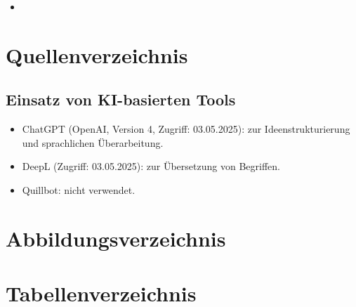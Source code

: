 \documentclass[11pt,a4paper]{article}
\makeatletter
\renewcommand{\listoffigures}{%
  \begingroup
    \@starttoc{lof}%
  \endgroup
}
\renewcommand{\listoftables}{%
  \begingroup
    \@starttoc{lot}%
  \endgroup
}
\makeatother
\begin{document}
\begin{itemize}
  \item 
\end{itemize}

\cleardoublepage
\section{Quellenverzeichnis}

\printbibliography[heading=none]

\vspace{1cm}

\subsection{Einsatz von KI-basierten Tools}
\begin{itemize}
  \item ChatGPT (OpenAI, Version 4, Zugriff: 03.05.2025): zur Ideenstrukturierung und sprachlichen Überarbeitung.
  \item DeepL (Zugriff: 03.05.2025): zur Übersetzung von Begriffen.
  \item Quillbot: nicht verwendet.
\end{itemize}

\cleardoublepage
\section{Abbildungsverzeichnis}
\listoffigures

\cleardoublepage
\section{Tabellenverzeichnis}
\listoftables
\end{document}
